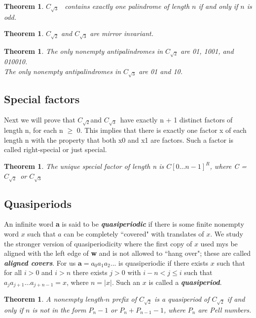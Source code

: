 \documentclass[a4paper]{article}
\newcommand{\term}[1]{\emph{\textbf{#1}}}
\newcommand{\Ctwo}{\ensuremath{C_{\sqrt{2}}}}
\newcommand{\Cthree}{\ensuremath{C_{\sqrt{3}}}}
\theoremstyle{definition}
\theoremstyle{remark}
\theoremstyle{remark}
\theoremstyle{plain}
\newtheorem{theorem}[definition]{Theorem}
\begin{document}
\begin{theorem}
$\Cthree$ ~contains exactly one palindrome of length $n$ if and only if $n$ is odd. 
\end{theorem}

\begin{theorem}
$\Ctwo$ and $\Cthree$ are mirror invariant. 
\end{theorem}

\begin{theorem}
The only nonempty antipalindromes in $\Ctwo$ are 01, 1001, and 010010.\\
The only nonempty antipalindromes in $\Cthree$ are 01 and 10.
\end{theorem}

\subsection{Special factors}
Next we will prove that \Ctwo and \Cthree \ have exactly n + 1 distinct factors of length n, for each n $\geq$ 0.  This implies that there is exactly one factor x of each length n with the property that both x0 and x1 are factors. Such a factor is called right-special or just special.  

\begin{theorem}
The unique special factor of length n is $C[0\ldots n-1]^{R}$, where C = \Ctwo\ or \Cthree
\end{theorem}

\subsection{Quasiperiods}

An infinite word \textbf{a} is said to be \term{quasiperiodic} if there is some finite nonempty word $x$ such that $a$ can be completely ``covered" with translates of $x$. 
We study the stronger version of quasiperiodicity where the first copy of $x$ used mys be aligned with the left edge of \textbf{w} and is not allowed to ``hang over"; these are called \term{aligned covers}. 
For us $\mathbf{a} = a_{0}a_{1}a_{2}...$ is quasiperiodic if there exists $x$ such that for all $i>0$ and $i>n$ there exists $j>0$ with $i-n<j\leq i$ such that $a_{j}a_{j+1}...a_{j+n-1}=x$, where $n=|x|$. Such an $x$ is called a \term{quasiperiod}. 

\begin{theorem}
A nonempty length-$n$ prefix of $\Ctwo$ is a quasiperiod of $\Ctwo$ if and only if $n$ is not in the form $P_n - 1$ or $P_n + P_{n-1} - 1$, where $P_n$ are Pell numbers.
\end{theorem}
\end{document}
